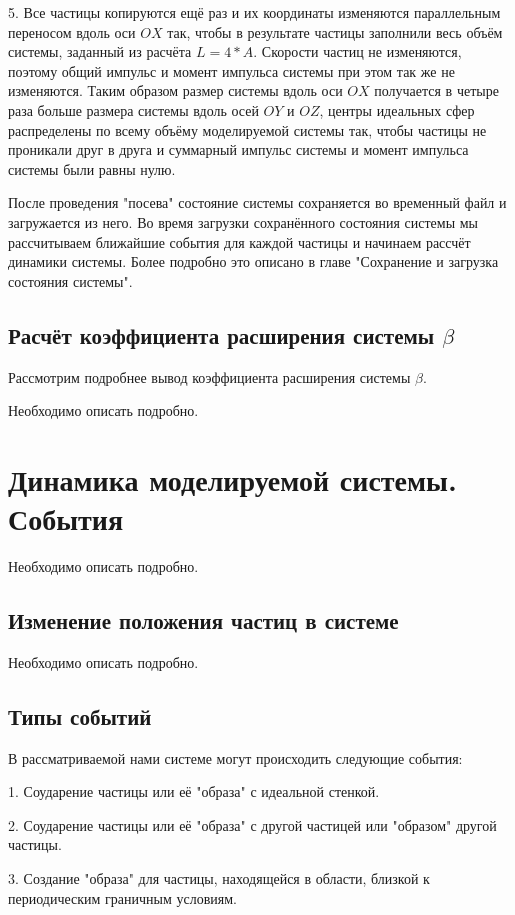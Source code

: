\documentclass{article}
\begin{document}
5. Все частицы копируются ещё раз и их координаты изменяются параллельным переносом вдоль оси $ OX $ так, чтобы в результате частицы заполнили весь объём системы, заданный из расчёта $ L = 4*A $. Скорости частиц не изменяются, поэтому общий импульс и момент импульса системы при этом так же не изменяются. Таким образом размер системы вдоль оси $ OX $ получается в четыре раза больше размера системы вдоль осей $ OY$ и $ OZ $, центры идеальных сфер распределены по всему объёму моделируемой системы так, чтобы частицы не проникали друг в друга и суммарный импульс системы и момент импульса системы были равны нулю.

После проведения "посева" состояние системы сохраняется во временный файл и загружается из него. Во время загрузки сохранённого состояния системы мы рассчитываем ближайшие события для каждой частицы и начинаем рассчёт динамики системы. Более подробно это описано в главе "Сохранение и загрузка состояния системы".

\subsection{Расчёт коэффициента расширения системы $ \beta $ }
Рассмотрим подробнее вывод коэффициента расширения системы $ \beta $.

Необходимо описать подробно.

\newpage
\section{Динамика моделируемой системы. События}
Необходимо описать подробно.
\subsection{Изменение положения частиц в системе}
Необходимо описать подробно.

\subsection{Типы событий}

В рассматриваемой нами системе могут происходить следующие события:

1. Соударение частицы или её "образа" с идеальной стенкой.

2. Соударение частицы или её "образа" с другой частицей или "образом" другой частицы.

3. Создание "образа" для частицы, находящейся в области, близкой к периодическим граничным условиям.
\end{document}
